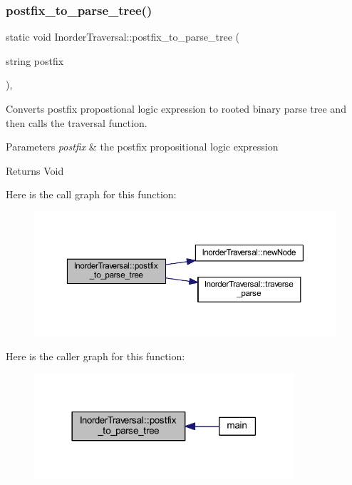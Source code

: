 \subsubsection{\texorpdfstring{postfix\+\_\+to\+\_\+parse\+\_\+tree()}{postfix\_to\_parse\_tree()}}
{\footnotesize\ttfamily static void Inorder\+Traversal\+::postfix\+\_\+to\+\_\+parse\+\_\+tree (\begin{DoxyParamCaption}\item[{string}]{postfix }\end{DoxyParamCaption})\hspace{0.3cm}{\ttfamily [inline]}, {\ttfamily [static]}}



Converts postfix propostional logic expression to rooted binary parse tree and then calls the traversal function. 


\begin{DoxyParams}{Parameters}
{\em postfix} & the postfix propositional logic expression \\
\hline
\end{DoxyParams}
\begin{DoxyReturn}{Returns}
Void 
\end{DoxyReturn}
Here is the call graph for this function\+:\nopagebreak
\begin{figure}[H]
\begin{center}
\leavevmode
\includegraphics[width=350pt]{class_inorder_traversal_a0997a41c18ddf565f5f460446ef3c8a2_cgraph}
\end{center}
\end{figure}
Here is the caller graph for this function\+:\nopagebreak
\begin{figure}[H]
\begin{center}
\leavevmode
\includegraphics[width=273pt]{class_inorder_traversal_a0997a41c18ddf565f5f460446ef3c8a2_icgraph}
\end{center}
\end{figure}
\mbox{\label{class_inorder_traversal_a9027f549ca60732409dbe4387785e0a4}} 
